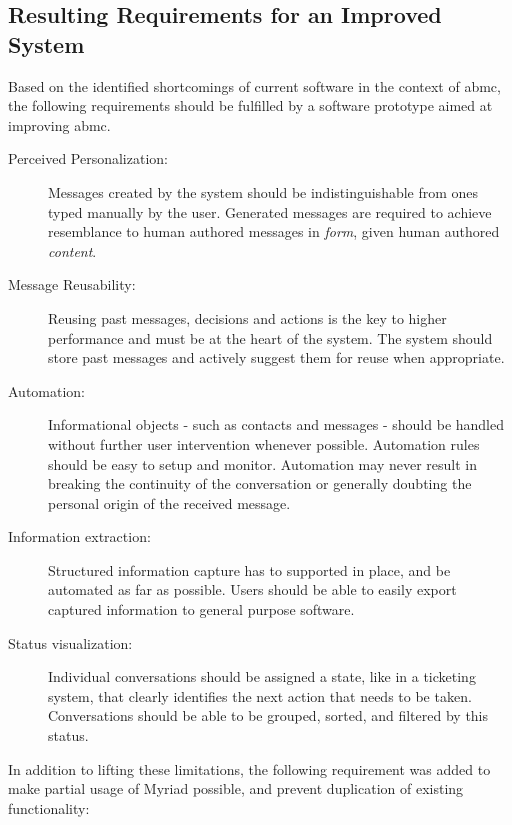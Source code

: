 \subsection{Resulting Requirements for an Improved System}

Based on the identified shortcomings of current software in the context of \gls{abmc}, the following requirements should be fulfilled by a software prototype aimed at improving \gls{abmc}.

\begin{description}

\item[Perceived Personalization:] Messages created by the system should be indistinguishable from ones typed manually by the user. Generated messages are required to achieve resemblance to human authored messages in \emph{form}, given human authored \emph{content}.

\item[Message Reusability:] Reusing past messages, decisions and actions is the key to higher performance and must be at the heart of the system. The system should store past messages and actively suggest them for reuse when appropriate.

\item[Automation:] Informational objects - such as contacts and messages - should be handled without further user intervention whenever possible. Automation rules should be easy to setup and monitor. Automation may never result in breaking the continuity of the conversation or generally doubting the personal origin of the received message.

\item[Information extraction:] Structured information capture has to supported in place, and be automated as far as possible. Users should be able to easily export captured information to general purpose software.

\item[Status visualization:] Individual conversations should be assigned a state, like in a ticketing system, that clearly identifies the next action that needs to be taken. Conversations should be able to be grouped, sorted, and filtered by this status.

\end{description}

In addition to lifting these limitations, the following requirement was added to make partial usage of Myriad possible, and prevent duplication of existing functionality:

